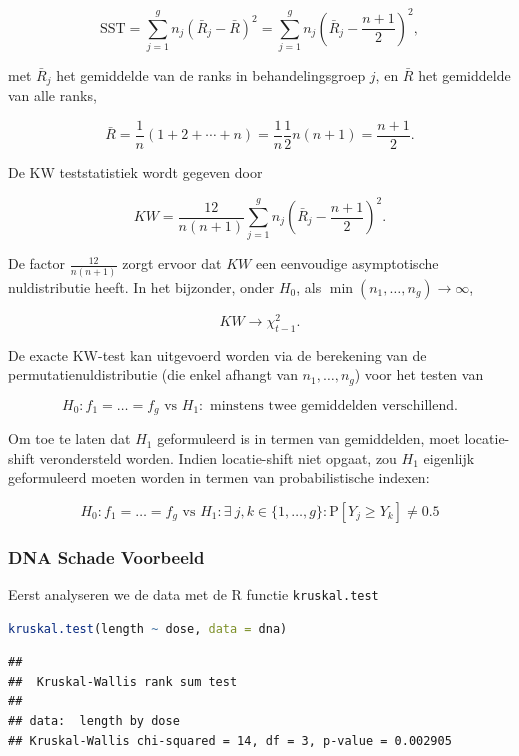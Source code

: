 \documentclass[
  12pt,dutch,coursenotes]{book}
\newcommand{\passthrough}[1]{#1}
\theoremstyle{definition}
\theoremstyle{definition}
\theoremstyle{definition}
\theoremstyle{definition}
\theoremstyle{remark}
\begin{document}
\[
     \text{SST} = \sum_{j=1}^g n_j \left(\bar{R}_j - \bar{R}\right)^2 = \sum_{j=1}^g n_j \left(\bar{R}_j - \frac{n+1}{2}\right)^2 ,
  \]

met \(\bar{R}_j\) het gemiddelde van de ranks in behandelingsgroep \(j\), en \(\bar{R}\) het gemiddelde van alle ranks,

\[
    \bar{R} = \frac{1}{n}(1+2+\cdots + n) = \frac{1}{n}\frac{1}{2}n(n+1) = \frac{n+1}{2}.
  \]

De KW teststatistiek wordt gegeven door

\[
    KW = \frac{12}{n(n+1)}  \sum_{j=1}^g n_j \left(\bar{R}_j - \frac{n+1}{2}\right)^2.
  \]

De factor \(\frac{12}{n(n+1)}\) zorgt ervoor dat \(KW\) een eenvoudige asymptotische nuldistributie heeft. In het bijzonder, onder \(H_0\), als \(\min(n_1,\ldots, n_g)\rightarrow \infty\),

\[
    KW  \rightarrow \chi^2_{t-1}.
  \]

De exacte KW-test kan uitgevoerd worden via de berekening van de permutatienuldistributie (die enkel afhangt van \(n_1, \ldots, n_g\)) voor het testen van

\[H_0: f_1=\ldots=f_g \text{ vs } H_1: \text{ minstens twee gemiddelden verschillend}.\]

Om toe te laten dat \(H_1\) geformuleerd is in termen van gemiddelden, moet locatie-shift verondersteld worden. Indien locatie-shift niet opgaat, zou \(H_1\) eigenlijk geformuleerd moeten worden in termen van probabilistische indexen:

\[H_0: f_1=\ldots=f_g \text{ vs } H_1: \exists\ j,k \in \{1,\ldots,g\} : \text{P}\left[Y_j\geq Y_k\right]\neq 0.5\]

\hypertarget{dna-schade-voorbeeld}{%
\subsubsection{DNA Schade Voorbeeld}\label{dna-schade-voorbeeld}}

Eerst analyseren we de data met de R functie \passthrough{\lstinline!kruskal.test!}

\begin{lstlisting}[language=R]
kruskal.test(length ~ dose, data = dna)
\end{lstlisting}

\begin{lstlisting}
## 
##  Kruskal-Wallis rank sum test
## 
## data:  length by dose
## Kruskal-Wallis chi-squared = 14, df = 3, p-value = 0.002905
\end{lstlisting}
\end{document}
